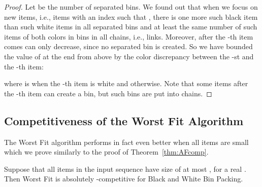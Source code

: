 \documentclass[11pt,a4paper]{article}
\begin{document}
\begin{proof}
Let  be the number of separated bins.
We found out that when we focus on new items, i.e., items with an index  such that ,
there is one more such black item than such white items in all separated bins
and at least the same number of such items of both colors in bins in all chains, i.e., links.
Moreover, after the -th item comes  can only decrease, since no separated bin is created.
So we have bounded the value of  at the end from above by the color discrepancy between the -st and the -th item:



where  is  when the -th item is white and  otherwise. 
Note that some items after the -th item can create a bin,
but such bins are put into chains.
\end{proof}

\subsection{Competitiveness of the Worst Fit Algorithm} \label{sec:WF-BWBP}

The Worst Fit algorithm performs in fact even better when all items are small
which we prove similarly to the proof of Theorem~\ref{thm:AFcomp}.

\begin{theorem}
\label{thm:WFparam}
Suppose that all items in the input sequence have size of at most ,
for a real .  Then Worst Fit is absolutely -competitive for Black and White Bin Packing.
\end{theorem}	
\end{document}
